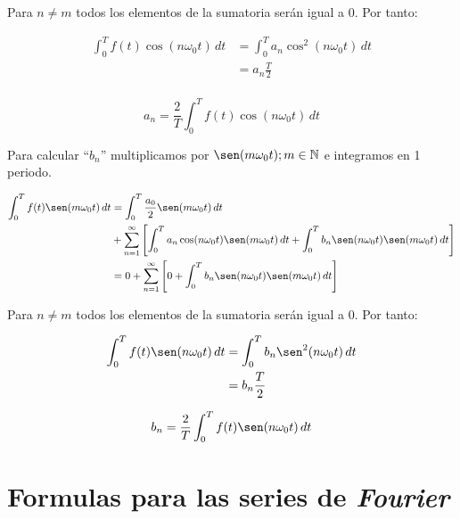Para $n\neq m$ todos los elementos de la sumatoria serán igual a $0$.
Por tanto:

\begin{equation*}
\begin{split}
    \int_{0}^{T}f(t)\cos(n\omega_0 t)\,dt
        &=\int_{0}^{T}a_n\cos^2(n\omega_0 t)\,dt\\
        &=a_n \frac{T}{2}\\
\end{split}
\end{equation*}

\begin{equation}
    a_n=\frac{2}{T}\int_{0}^{T}f(t)\cos(n\omega_0 t)\,dt
\end{equation}

Para calcular ``$b_n$'' multiplicamos por $\sen(m\omega_0 t); m\in\mathbb{N}$ e
integramos en 1 periodo.

\begin{equation*}
\begin{split}
    \int_{0}^{T}f(t)\sen(m\omega_0 t)\,dt
        &=\int_{0}^{T}\frac{a_0}{2}\sen(m\omega_0 t)\,dt\\
        &+\sum_{n=1}^{\infty}\left[
          \int_{0}^{T}a_n\cos(n\omega_0 t)\sen(m\omega_0 t)\,dt+
          \int_{0}^{T}b_n\sen(n\omega_0 t)\sen(m\omega_0 t)\,dt\right]\\
        &=0+\sum_{n=1}^{\infty}\left[
          0+\int_{0}^{T}b_n\sen(n\omega_0 t)\sen(m\omega_0 t)\,dt\right]\\
\end{split}
\end{equation*}

Para $n\neq m$ todos los elementos de la sumatoria serán igual a $0$.
Por tanto:

\begin{equation*}
\begin{split}
    \int_{0}^{T}f(t)\sen(n\omega_0 t)\,dt
        &=\int_{0}^{T}b_n\sen^2(n\omega_0 t)\,dt\\
        &=b_n \frac{T}{2}\\
\end{split}
\end{equation*}

\begin{equation}
    b_n=\frac{2}{T}\int_{0}^{T}f(t)\sen(n\omega_0 t)\,dt
\end{equation}

\section{Formulas para las series de \emph{Fourier}}

